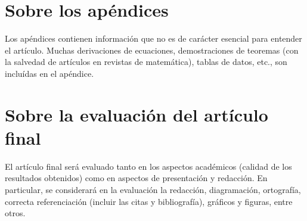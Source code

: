 \documentclass[12pt, letterpaper]{article}
\begin{document}
\appendix

\section{Sobre los ap\'endices}
	Los ap\'endices contienen informaci\'on que no es de car\'acter esencial para entender el art\'iculo. Muchas derivaciones de ecuaciones, demostraciones de teoremas (con la salvedad de art\'iculos en revistas de matem\'atica), tablas de datos, etc., son inclu\'idas en el ap\'endice.
	
\section{Sobre la evaluaci\'on del art\'iculo final}
	El art\'iculo final ser\'a evaluado tanto en los aspectos acad\'emicos (calidad de los resultados obtenidos) como en aspectos de presentaci\'on y redacci\'on. En particular, se considerar\'a en la evaluaci\'on la redacci\'on, diagramaci\'on, ortograf\'ia, correcta referenciaci\'on (incluir las citas y bibliograf\'ia), gr\'aficos y figuras, entre otros.
\end{document}
